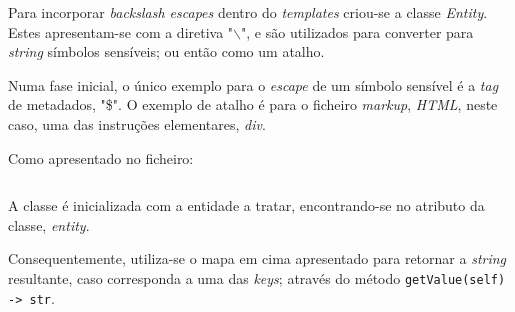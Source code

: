 \documentclass[../relatorio.tex]{subfiles}
\begin{document}
    Para incorporar \textit{backslash escapes} dentro 
    do \textit{templates} criou-se a classe \textit{Entity}.
    Estes apresentam-se com a diretiva "$\backslash$", 
    e são utilizados para converter para \textit{string}
    símbolos sensíveis; ou então como um atalho.

    Numa fase inicial, o único exemplo para o \textit{escape}
    de um símbolo sensível é a \textit{tag} de metadados, "\$".
    O exemplo de atalho é para o ficheiro \textit{markup}, \textit{HTML},
    neste caso, uma das instruções elementares, \textit{div}.

    Como apresentado no ficheiro:
    \inputminted[firstline=8, lastline=11]{python}{../modules/Entity.py}

    A classe é inicializada com a entidade a tratar, encontrando-se no 
    atributo da classe, \textit{entity}.

    Consequentemente, utiliza-se o mapa em cima apresentado para 
    retornar a \textit{string} resultante, caso corresponda a uma das \textit{keys};
    através do método \texttt{getValue(self) -> str}.
\end{document}
